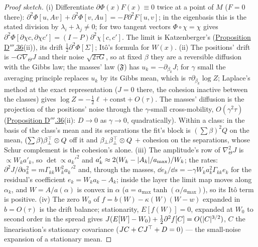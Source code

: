 \begin{proof}[Proof sketch]
(i) Differentiate $\partial\Phi(x)F(x)\equiv0$ twice at a point of $M$ ($F = 0$ there):
$\partial^2\Phi[u,Av] + \partial^2\Phi[v,Au] = -P\partial^2F[u,v]$; in the eigenbasis this is the stated division by
$\lambda_i + \lambda_j\ne0$; for two tangent vectors $\Phi\circ\chi = \chi$ gives
$\partial^2\Phi[\partial\chi c,\partial\chi c'] = (I - P)\partial^2\chi[c,c']$. The limit is Katzenberger's
(\hyperref[res:thmDppp:36]{Proposition D$'''$.36}(ii)), its drift $\frac12\partial^2\Phi[\Sigma]$; It\^o's formula for
$W(x)$. (ii) The positions' drift is $-G\nabla_\Theta J$ and their noise $\sqrt{2\tau G}$, so at fixed $\beta$ they are
a reversible diffusion with the Gibbs law; the masses' law \textup{($\mathfrak{F}$)} has $u_k = -\partial_{\beta_k}J$;
for $\gamma$ small the averaging principle replaces $u_k$ by its Gibbs mean, which is $\tau\partial_{\beta_k}\log Z$;
Laplace's method at the exact representation ($J = 0$ there, the cohesion inactive between the classes) gives
$\log Z = -\frac12\ell + \text{const} + O(\tau)$. The masses' diffusion is the projection of the positions' noise
through the $\gamma$-small cross-mobility, $O(\gamma^2\tau)$ (\hyperref[res:thmDppp:36]{Proposition D$'''$.36}(ii):
$D\to0$ as $\gamma\to0$, quadratically). Within a class: in the basis of the class's mean and its separations the fit's
block is $(\sum\beta)^2Q$ on the mean, $(\sum\beta)\beta_\perp^\top\otimes Q$ off it and
$\beta_\perp\beta_\perp^\top\otimes Q$ + cohesion on the separations, whose Schur complement is the cohesion's alone.
(iii) The amplitude's row of $\nabla^2_\Theta J$ is $\propto W_ka'_k$, so $\det\propto a_k'^2$ and
$a'_k\approx2(W_k - \lvert A_k\rvert/a_{\max})/W_k$; the rates: $\partial^2J/\partial\alpha_k^2 = m\Gamma_{kk}W_k^2a_k'^2$
and, through the masses, $\dd e_k/\dd s = -\gamma W_ka_k^2\Gamma_{kk}e_k$ for the residual's coefficient
$e_k = W_ka_k - A_k$; inside the layer the limit map moves along $\alpha_k$, and $W = A/a(\alpha)$ is convex in
$\alpha$ ($a = a_{\max}\tanh(\alpha/a_{\max})$), so its It\^o term is positive. (iv) The zero $W_0$ of
$f = b(W) - \kappa(W)(W - w)$ expanded in $b = O(\tau)$ is the drift balance; stationarity, $E[f(W)] = 0$, expanded at
$W_0$ to second order in the spread gives $J(E[W] - W_0) + \tfrac12\partial^2f[C] = O(\lvert C\rvert^{3/2})$, $C$ the
linearisation's stationary covariance ($JC + CJ^\top + D = 0$) --- the small-noise expansion of a stationary mean.
\end{proof}
